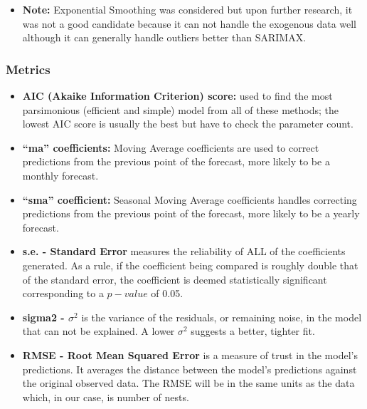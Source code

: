 \documentclass[
  letterpaper,
  DIV=11,
  numbers=noendperiod]{scrartcl}
\providecommand{\tightlist}{%
  \setlength{\itemsep}{0pt}\setlength{\parskip}{0pt}}\usepackage{longtable,booktabs,array}
\begin{document}
\begin{itemize}
\begin{itemize}
    Parameters, can be used as a comparison to validate the correctness
    of the chosen model, e.g., changing p=0 (no immediate memory) to p=1
    (1 month memory). Depending on what the SARIMAX model is, I will
    research what its ``neighbor'' should be and then test to make sure
    it is not better than the chosen model. There is also a balance to
    maintain between the simplicity and the accuracy of the model - one
    make the model as parsimonious as possible with the fewest number of
    parameters whilst maintaining accuracy.
  \end{itemize}
\item
  \textbf{Note:} Exponential Smoothing was considered but upon further
  research, it was not a good candidate because it can not handle the
  exogenous data well although it can generally handle outliers better
  than SARIMAX.
\end{itemize}

\subsubsection{Metrics}\label{metrics}

\begin{itemize}
\tightlist
\item
  \textbf{AIC (Akaike Information Criterion) score:} used to find the
  most parsimonious (efficient and simple) model from all of these
  methods; the lowest AIC score is usually the best but have to check
  the parameter count.
\item
  \textbf{``ma'' coefficients:} Moving Average coefficients are used to
  correct predictions from the previous point of the forecast, more
  likely to be a monthly forecast.
\item
  \textbf{``sma'' coefficient:} Seasonal Moving Average coefficients
  handles correcting predictions from the previous point of the
  forecast, more likely to be a yearly forecast.
\item
  \textbf{s.e. - Standard Error} measures the reliability of ALL of the
  coefficients generated. As a rule, if the coefficient being compared
  is roughly double that of the standard error, the coefficient is
  deemed statistically significant corresponding to a \(p-value\) of
  0.05.
\item
  \textbf{sigma2 - \(\sigma^2\)} is the variance of the residuals, or
  remaining noise, in the model that can not be explained. A lower
  \(\sigma^2\) suggests a better, tighter fit.
\item
  \textbf{RMSE - Root Mean Squared Error} is a measure of trust in the
  model's predictions. It averages the distance between the model's
  predictions against the original observed data. The RMSE will be in
  the same units as the data which, in our case, is number of nests.
\end{itemize}
\end{document}
